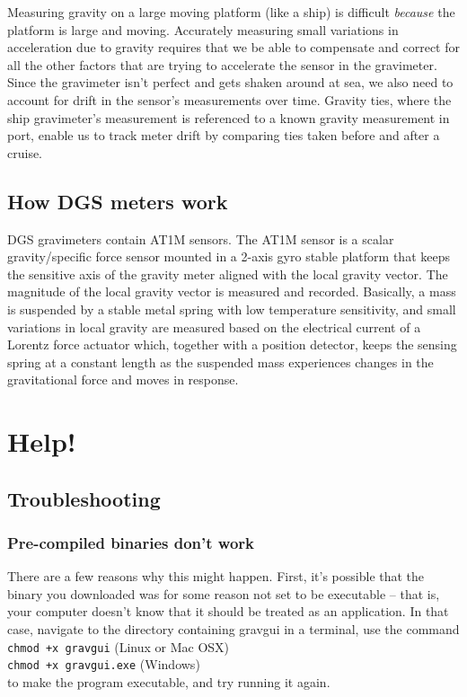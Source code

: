 \documentclass{pfpe-manual}
\begin{document}
Measuring gravity on a large moving platform (like a ship) is difficult \emph{because} the platform is large and moving. Accurately measuring small variations in acceleration due to gravity requires that we be able to compensate and correct for all the other factors that are trying to accelerate the sensor in the gravimeter. Since the gravimeter isn't perfect and gets shaken around at sea, we also need to account for drift in the sensor's measurements over time. Gravity ties, where the ship gravimeter's measurement is referenced to a known gravity measurement in port, enable us to track meter drift by comparing ties taken before and after a cruise. 

\subsection{How DGS meters work}
DGS gravimeters contain AT1M sensors. The AT1M sensor is a scalar gravity/specific force sensor mounted in a 2-axis gyro stable platform that keeps the sensitive axis of the gravity meter aligned with the local gravity vector. The magnitude of the local gravity vector is measured and recorded. Basically, a mass is suspended by a stable metal spring with low temperature sensitivity, and small variations in local gravity are measured based on the electrical current of a Lorentz force actuator which, together with a position detector, keeps the sensing spring at a constant length as the suspended mass experiences changes in the gravitational force and moves in response.

\section{Help!}
\label{helphelp}

\subsection{Troubleshooting}

\subsubsection{Pre-compiled binaries don't work}
There are a few reasons why this might happen. First, it's possible that the binary you downloaded was for some reason not set to be executable -- that is, your computer doesn't know that it should be treated as an application. In that case, navigate to the directory containing gravgui in a terminal, use the command\\
\texttt{chmod +x gravgui} (Linux or Mac OSX) \\
\texttt{chmod +x gravgui.exe} (Windows) \\
to make the program executable, and try running it again.
\end{document}
